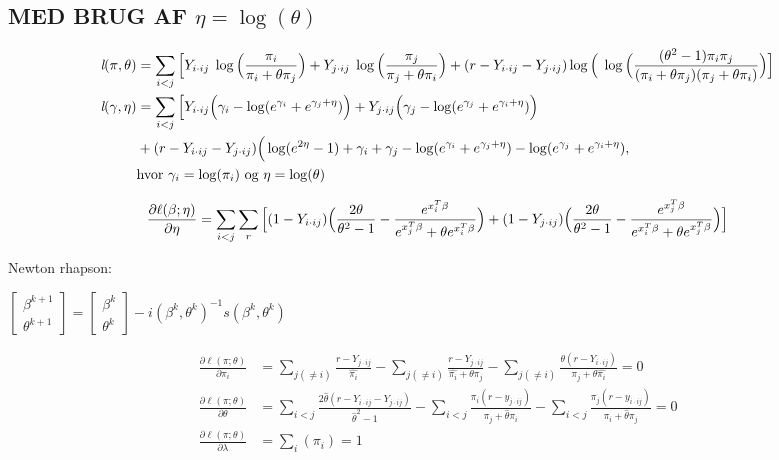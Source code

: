 \documentclass[11pt,a4paper]{article}
\begin{document}
\subsection{MED BRUG AF $\eta=\log(\theta)$}
\begin{align*}
\textit{l}(\pi,\theta)
&=\sum_{i<j}\Big{[}Y_{i\cdot ij}\;\log\Big{(}\frac{\pi_i}{\pi_i+\theta\pi_j}\Big{)}
+ Y_{j\cdot ij}\;\log\Big{(}\frac{\pi_j}{\pi_j+\theta\pi_i}\Big{)}
+ (r-Y_{i\cdot ij}-Y_{j\cdot ij}) \log \Big{(}\;\log\Big{(}\frac{(\theta^2-1)\pi_i \pi_j}{(\pi_i+\theta\pi_j)(\pi_j+\theta\pi_i)}\Big{)}\Big{]}\\
\textit{l}(\gamma,\eta)
&=\sum_{i<j}\Big{[}Y_{i\cdot ij}\Big{(}\gamma_i-\log(e^{\gamma_i}+ e^{\gamma_j+\eta})\Big{)}
+Y_{j\cdot ij}\Big{(}\gamma_j-\log(e^{\gamma_j}+ e^{\gamma_i+\eta})\Big{)}\\
& +(r-Y_{i\cdot ij}-Y_{j\cdot ij}) \Big{(} \log(e^{2\eta}-1)+\gamma_i+\gamma_j-\log(e^{\gamma_i}+ e^{\gamma_j+\eta})-\log(e^{\gamma_j}+e^{\gamma_i+\eta}),\\
&\text{hvor }\gamma_i=\log (\pi_i)\text{ og }\eta=\log(\theta)
\end{align*}

\begin{equation}
\frac{\partial \ell(\beta;\eta)}{\partial \eta}=
\sum_{i<j}\sum_r\Big{[}
 (1-Y_{i\cdot ij})\Big{(}\frac{2\theta}{\theta^2-1}-\frac{e^{x_i^T\beta}}{e^{x_j^T\beta}+\theta e^{x_i^T\beta}}\Big{)}
+(1-Y_{j\cdot ij})\Big{(}\frac{2\theta}{\theta^2-1}-\frac{e^{x_j^T\beta}}{e^{x_i^T\beta}+\theta e^{x_j^T\beta}}\Big{)} \Big{]}
\end{equation}





Newton rhapson:
\begin{center}
$
\begin{bmatrix}
\beta^{k+1} \\
\theta^{k+1}
\end{bmatrix}
=
\begin{bmatrix}
\beta^{k} \\
\theta^{k}
\end{bmatrix}
- i(\beta^k,\theta^k)^{-1}s(\beta^k,\theta^k)
$
\end{center}
\begin{equations}
\begin{align}
 \frac{\partial \ell(\pi;\theta)}{\partial \pi_i}&= 
\sum_{j(\neq i)}\frac{r-Y_{j\cdot ij}}{\hat{\pi_i}}-\sum_{j(\neq i)}\frac{r-Y_{j\cdot ij}}{\hat{\pi_i}+\theta \pi_j}-\sum_{j(\neq i)}\frac{\theta (r-Y_{i\cdot ij})}{\pi_j + \theta \hat{\pi_i}}=0\\
\frac{\partial \ell(\pi;\theta)}{\partial \theta}&=
\sum_{i<j}\frac{2\hat{\theta}(r-Y_{i\cdot ij}-Y_{j\cdot ij})}{\hat{\theta}^2-1}
-\sum_{i<j}\frac{\pi_i(r-y_{j\cdot ij})}{\pi_j+\hat{\theta}\pi_i}
-\sum_{i<j}\frac{\pi_j(r-y_{i\cdot ij})}{\pi_i +\hat{\theta}\pi_j}=0\\
\frac{\partial \ell(\pi;\theta)}{\partial \lambda}&=
\sum_i(\pi_i)=1
\end{align}
\end{equations}
\end{document}
